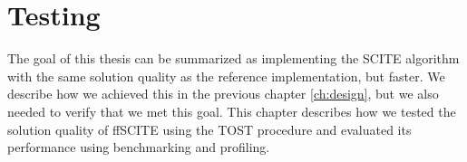 \chapter{Testing}
\label{ch:testing}

The goal of this thesis can be summarized as implementing the \ac{SCITE} algorithm with the same solution quality as the reference implementation, but faster. We describe how we achieved this in the previous chapter \ref{ch:design}, but we also needed to verify that we met this goal. This chapter describes how we tested the solution quality of \ac{ffSCITE} using the \ac{TOST} procedure \cite{schuirmann1987comparison} and evaluated its performance using benchmarking and profiling. 




